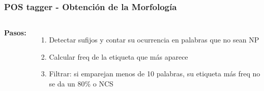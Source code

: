 \documentclass{beamer}
\begin{document}
\begin{frame}[fragile]
\frametitle{POS tagger - Obtención de la Morfología}
\begin{columns}[t] %
\textbf{Pasos:}
\begin{enumerate}
\item Detectar sufijos y contar su ocurrencia en palabras que no sean NP
\item Calcular freq de la etiqueta que más aparece
\item Filtrar: si emparejan menos de 10 palabras, su etiqueta más freq no se da un 80\% o NCS
\end{enumerate}
            
\end{columns}
\end{frame}
\end{document}
